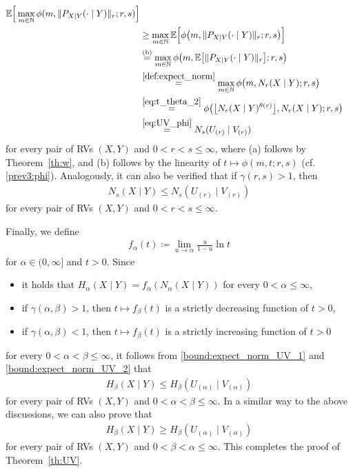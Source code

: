 \documentclass[conference, draftcls, onecolumn]{IEEEtran}
\theoremstyle{plain}
\newcommand{\thref}[1]{Theorem~\ref{#1}}
\begin{document}
\begin{IEEEproof}[Proof of \thref{th:UV}]
\begin{align}
\mathbb{E} \Big[ \max_{m \in \mathbb{N}} \phi(m, \| P_{X|Y}(\cdot \mid Y) \|_{r}; r, s) \Big]
\\
& \ge
\max_{m \in \mathbb{N}} \mathbb{E} \Big[ \phi \big(m, \| P_{X|Y}(\cdot \mid Y) \|_{r} ; r, s \big) \Big]
\\
& \overset{\text{(b)}}{=}
\max_{m \in \mathbb{N}} \phi \big(m, \mathbb{E} \big[ \| P_{X|Y}(\cdot \mid Y) \|_{r} \big] ; r, s \big)
\\
& \overset{\eqref{def:expect_norm}}{=}
\max_{m \in \mathbb{N}} \phi \big(m, N_{r}(X \mid Y) ; r, s \big)
\\
& \overset{\eqref{eq:t_theta_2}}{=}
\phi \big( \big\lfloor N_{r}(X \mid Y)^{\theta( r )} \big\rfloor , N_{r}(X \mid Y) ; r, s \big)
\\
& \overset{\eqref{eq:UV_phi}}{=}
N_{s}(U_{(r)} \mid V_{(r)})
\label{bound:expect_norm_UV_1}
\end{align}
for every pair of RVs $(X, Y)$ and $0 < r < s \le \infty$, where (a) follows by \thref{th:w}, and (b) follows by the linearity of $t \mapsto \phi(m, t; r, s)$ (cf. \eqref{prev3:phi}).
Analogously, it can also be verified that if $\gamma( r, s ) > 1$, then
\begin{align}
N_{s}(X \mid Y)
\le
N_{s}(U_{(r)} \mid V_{(r)})
\label{bound:expect_norm_UV_2}
\end{align}
for every pair of RVs $(X, Y)$ and $0 < r < s \le \infty$.

Finally, we define
\begin{align}
f_{\alpha}( t )
\coloneqq
\lim_{u \to \alpha} \frac{ u }{ 1 - u } \ln t
\end{align}
for $\alpha \in (0, \infty]$ and $t > 0$.
Since
\begin{itemize}
\item
it holds that $H_{\alpha}(X \mid Y) = f_{\alpha}( N_{\alpha}(X \mid Y) )$ for every $0 < \alpha \le \infty$,
\item
if $\gamma( \alpha, \beta ) > 1$, then $t \mapsto f_{\beta}( t )$ is a strictly decreasing function of $t > 0$,
\item
if $\gamma( \alpha, \beta ) < 1$, then $t \mapsto f_{\beta}( t )$ is a strictly increasing function of $t > 0$
\end{itemize}
for every $0 < \alpha < \beta \le \infty$, it follows from \eqref{bound:expect_norm_UV_1} and \eqref{bound:expect_norm_UV_2} that
\begin{align}
H_{\beta}(X \mid Y)
\le
H_{\beta}(U_{(\alpha)} \mid V_{(\alpha)})
\end{align}
for every pair of RVs $(X, Y)$ and $0 < \alpha < \beta \le \infty$.
In a similar way to the above discussions, we can also prove that
\begin{align}
H_{\beta}(X \mid Y)
\ge
H_{\beta}(U_{(\alpha)} \mid V_{(\alpha)})
\end{align}
for every pair of RVs $(X, Y)$ and $0 < \beta < \alpha \le \infty$.
This completes the proof of \thref{th:UV}.
\end{IEEEproof}
\end{document}
